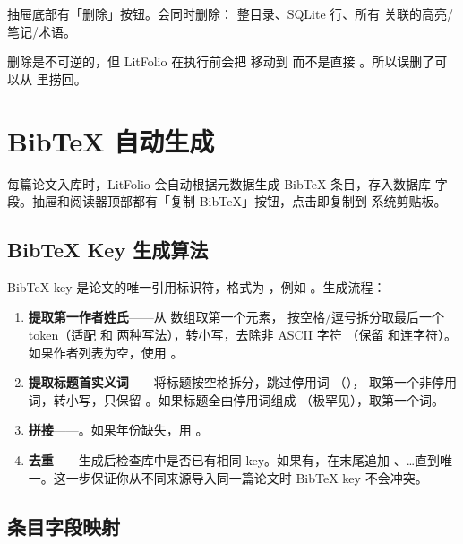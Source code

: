抽屉底部有「删除」按钮。会同时删除： 整目录、SQLite 行、所有
关联的高亮/笔记/术语。

\begin{warnbox}
删除是不可逆的，但 LitFolio 在执行前会把  移动到
 而不是直接 。所以误删了可以从
 里捞回。
\end{warnbox}

\section{BibTeX 自动生成}

每篇论文入库时，LitFolio 会自动根据元数据生成 BibTeX 条目，存入数据库
 字段。抽屉和阅读器顶部都有「复制 BibTeX」按钮，点击即复制到
系统剪贴板。


\subsection{BibTeX Key 生成算法}

BibTeX key 是论文的唯一引用标识符，格式为
，例如
。生成流程：

\begin{enumerate}
  \item \textbf{提取第一作者姓氏}——从  数组取第一个元素，
    按空格/逗号拆分取最后一个 token（适配  和
     两种写法），转小写，去除非 ASCII 字符
    （保留  和连字符）。如果作者列表为空，使用 。
  \item \textbf{提取标题首实义词}——将标题按空格拆分，跳过停用词
    （），
    取第一个非停用词，转小写，只保留 。如果标题全由停用词组成
    （极罕见），取第一个词。
  \item \textbf{拼接}——。如果年份缺失，用 。
  \item \textbf{去重}——生成后检查库中是否已有相同 key。如果有，在末尾追加
    、\ldots 直到唯一。这一步保证你从不同来源导入同一篇论文时
    BibTeX key 不会冲突。
\end{enumerate}

\subsection{条目字段映射}

